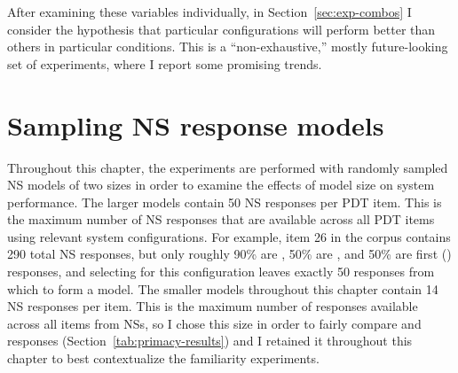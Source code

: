 After examining these variables individually, in Section~\ref{sec:exp-combos} I consider the hypothesis that particular configurations  will perform better than others in particular conditions. This is a ``non-exhaustive,'' mostly future-looking set of experiments, where I report some promising trends.


\section{Sampling NS response models}
\label{sec:sampling}

Throughout this chapter, the experiments are performed with randomly sampled NS models of two sizes in order to examine the effects of model size on system performance. The larger models contain 50 NS responses per PDT item. This is the maximum number of NS responses that are available across all PDT items using relevant system configurations. For example, item 26 in the corpus contains 290 total NS responses, but only roughly 90\% are , 50\% are , and 50\% are first () responses, and selecting for this configuration leaves exactly 50 responses from which to form a model. The smaller models throughout this chapter contain 14 NS responses per item. This is the maximum number of responses available across all items from  NSs, so I chose this size in order to fairly compare  and  responses (Section~\ref{tab:primacy-results}) and I retained it throughout this chapter to best contextualize the familiarity experiments.

